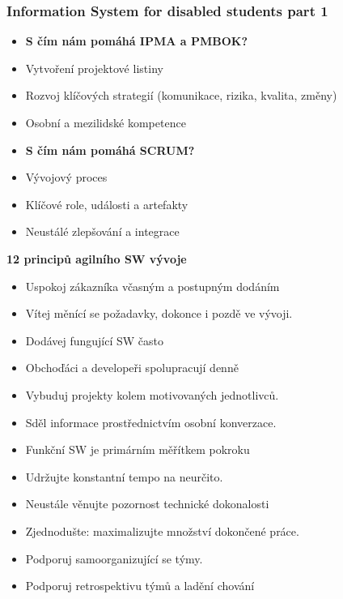 \documentclass[11pt,a4paper]{article}
\begin{document}
    \subsubsection{Information System for disabled students part 1}
        \begin{multicols}{2}
        \begin{itemize}
            \item \textbf{S čím nám pomáhá IPMA a PMBOK?}
            \item Vytvoření projektové listiny
            \item Rozvoj klíčových strategií (komunikace, rizika, kvalita, změny)
            \item Osobní a mezilidské kompetence
            \item \textbf{S čím nám pomáhá SCRUM?}
            \item Vývojový proces
            \item Klíčové role, události a artefakty
            \item Neustálé zlepšování a integrace
        \end{itemize}
        \end{multicols}
        \textbf{12 principů agilního SW vývoje}
        \begin{itemize}
            \item Uspokoj zákazníka včasným a postupným dodáním
            \item Vítej měnící se požadavky, dokonce i pozdě ve vývoji.
            \item Dodávej fungující SW často
            \item Obchoďáci a developeři spolupracují denně
            \item Vybuduj projekty kolem motivovaných jednotlivců.
            \item Sděl informace prostřednictvím osobní konverzace.
            \item Funkční SW je primárním měřítkem pokroku
            \item Udržujte konstantní tempo na neurčito.
            \item Neustále věnujte pozornost technické dokonalosti
            \item Zjednodušte: maximalizujte množství dokončené práce.
            \item Podporuj samoorganizující se týmy.
            \item Podporuj retrospektivu týmů a ladění chování
        \end{itemize}
\end{document}
